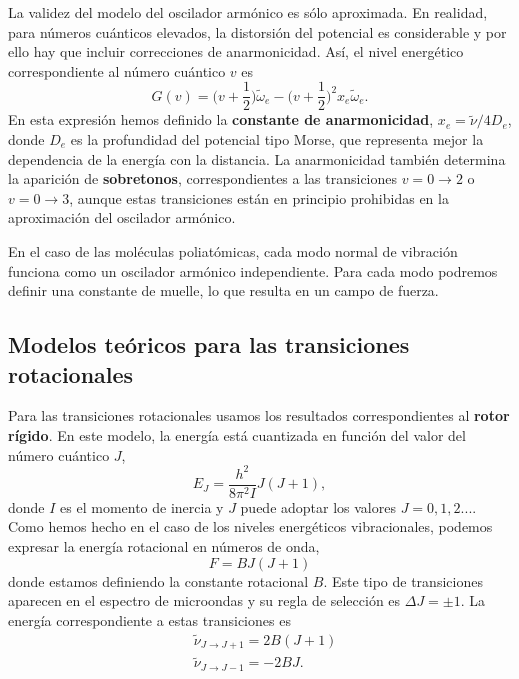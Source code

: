 \documentclass{tufte-handout}
\begin{document}
La validez del modelo del oscilador armónico es sólo aproximada.
En realidad, para números cuánticos elevados, la distorsión del
potencial es considerable y por ello hay que incluir correcciones
de anarmonicidad. Así, el nivel energético correspondiente al 
número cuántico $v$ es
\begin{equation}
    G(v) = \bigg(v+\frac{1}{2}\bigg)\tilde{\omega}_e - \bigg(v+\frac{1}{2}\bigg)^2x_e\tilde{\omega}_e.
\end{equation}
En esta expresión hemos definido la \textbf{constante de anarmonicidad}, 
$x_e=\tilde{\nu}/4D_e$, donde $D_e$ es la profundidad del potencial
tipo Morse, que representa mejor la dependencia de la energía con
la distancia. La anarmonicidad también determina la aparición
de \textbf{sobretonos}, correspondientes a las transiciones
$v=0\rightarrow 2$ o $v=0\rightarrow 3$, aunque estas transiciones 
están en principio prohibidas en la aproximación del oscilador armónico.

En el caso de las moléculas poliatómicas, cada modo normal de vibración
funciona como un oscilador armónico independiente. Para cada modo 
podremos definir una constante de muelle, lo que resulta en un
campo de fuerza.

\subsection{Modelos teóricos para las transiciones rotacionales}
Para las transiciones rotacionales usamos los resultados  
correspondientes al \textbf{rotor rígido}. En este modelo, 
la energía está cuantizada en función del valor del número cuántico
$J$,
\begin{equation}
    E_J=\frac{h^2}{8\pi^2I}J(J+1),
\end{equation}
donde $I$ es el momento de inercia y $J$ puede adoptar los valores 
$J=0,1,2...$. Como hemos hecho en el caso de los niveles energéticos
vibracionales, podemos expresar la energía rotacional en números de 
onda,
\begin{equation}
    F=BJ(J+1)
    \label{eq:F}
\end{equation}
donde estamos definiendo la constante rotacional $B$. Este
tipo de transiciones aparecen en el espectro de microondas y su
regla de selección es $\Delta J=\pm 1$. La energía correspondiente 
a estas transiciones es
\begin{align}
    &\tilde{\nu}_{J\rightarrow J+1} = 2B(J+1)\\
    &\tilde{\nu}_{J\rightarrow J-1} = -2BJ.
\end{align}
\end{document}
